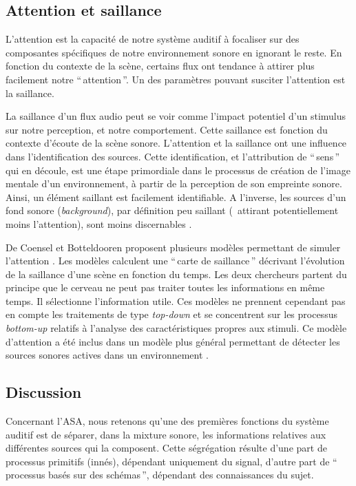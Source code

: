 \subsection{Attention et saillance}

L'attention est la capacité de notre système auditif à focaliser sur des composantes spécifiques de notre environnement sonore en ignorant le reste. En fonction du contexte de la scène, certains flux ont tendance à attirer plus facilement notre ``\,attention\,''. Un des paramètres pouvant susciter l’attention est la saillance.

La saillance d'un flux audio peut se voir comme l’impact potentiel d’un stimulus sur notre perception, et notre comportement. Cette saillance est fonction du contexte d'écoute de la scène sonore. L’attention et la saillance ont une influence dans l’identification des sources. Cette identification, et l'attribution de ``\,sens\,'' qui en découle, est une étape primordiale dans le processus de création de l’image mentale d’un environnement, à partir de la perception de son empreinte sonore. Ainsi, un élément saillant est facilement identifiable. A l'inverse, les sources d'un fond sonore (\emph{background}), par définition peu saillant (\ie~attirant potentiellement moins l’attention), sont moins discernables \citep{elhilali2009interaction}.

De Coensel et Botteldooren proposent plusieurs modèles permettant de simuler l’attention \citep{botteldooren2009role,de2010model,de2010application}. Les modèles calculent une ``\,carte de saillance\,'' décrivant l’évolution de la saillance d’une scène en fonction du temps. Les deux chercheurs partent du principe que le cerveau ne peut pas traiter toutes les informations en même temps. Il sélectionne l'information utile. Ces modèles ne prennent cependant pas en compte les traitements de type \emph{top-down} et se concentrent sur les processus \emph{bottom-up} relatifs à l’analyse des caractéristiques propres aux stimuli. Ce modèle d'attention a été inclus dans un modèle plus général permettant de détecter les sources sonores actives dans un environnement \citep{oldoni2012computational,oldoni2013computational}. 

\subsection{Discussion}

Concernant l'ASA, nous retenons qu'une des premières fonctions du système auditif est de séparer, dans la mixture sonore, les informations relatives aux différentes sources qui la composent. Cette ségrégation résulte d'une part de processus primitifs (innés), dépendant uniquement du signal, d'autre part de ``\,processus basés sur des schémas\,'', dépendant des connaissances du sujet. 

